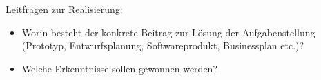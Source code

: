 \renewcommand*{\authorOfNextLines}{HTL Weiz}
Leitfragen zur Realisierung:
\begin{itemize}
	\item Worin besteht der konkrete Beitrag zur Lösung der Aufgabenstellung (Prototyp, Entwurfsplanung, Softwareprodukt, Businessplan etc.)?
	\item Welche Erkenntnisse sollen gewonnen werden?
\end{itemize}
